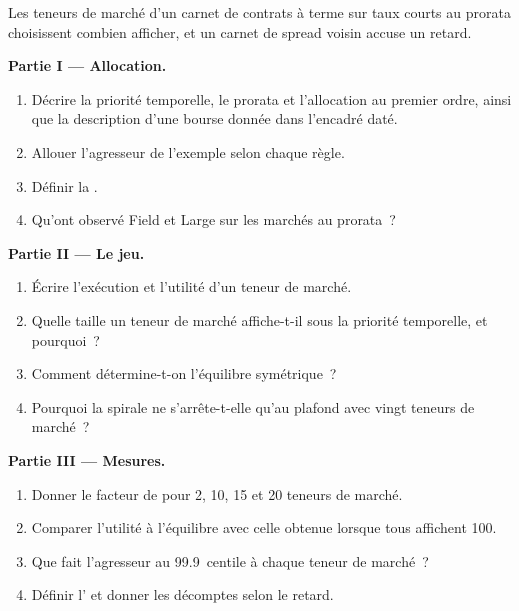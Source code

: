 \begin{problem}\label{pb:hf:futures-market-making:1}
Les teneurs de marché d'un carnet de contrats à terme sur taux courts au prorata choisissent combien afficher, et un carnet de spread voisin accuse un retard.

\medskip\noindent\textbf{Partie I --- Allocation.}
\begin{enumerate}
\item Décrire la priorité temporelle, le prorata et l'allocation au premier ordre, ainsi que la description d'une bourse donnée dans l'encadré daté.
\item Allouer l'agresseur de l'exemple selon chaque règle.
\item Définir la .
\item Qu'ont observé Field et Large sur les marchés au prorata~?
\end{enumerate}

\medskip\noindent\textbf{Partie II --- Le jeu.}
\begin{enumerate}[resume]
\item Écrire l'exécution et l'utilité d'un teneur de marché.
\item Quelle taille un teneur de marché affiche-t-il sous la priorité temporelle, et pourquoi~?
\item Comment détermine-t-on l'équilibre symétrique~?
\item Pourquoi la spirale ne s'arrête-t-elle qu'au plafond avec vingt teneurs de marché~?
\end{enumerate}

\medskip\noindent\textbf{Partie III --- Mesures.}
\begin{enumerate}[resume]
\item Donner le facteur de  pour 2, 10, 15 et 20 teneurs de marché.
\item Comparer l'utilité à l'équilibre avec celle obtenue lorsque tous affichent 100.
\item Que fait l'agresseur au 99.9~centile à chaque teneur de marché~?
\item Définir l' et donner les décomptes selon le retard.
\end{enumerate}


\end{problem}
